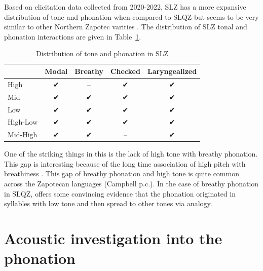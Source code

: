 \documentclass[12pt, letterpaper]{article}
\providecommand{\lsptoprule}{\midrule\toprule}
\providecommand{\lspbottomrule}{\bottomrule\midrule}
\begin{document}
Based on elicitation data collected from 2020-2022, SLZ has a more expansive distribution of tone and phonation when compared to SLQZ but seems to be very similar to other Northern Zapotec varities \citep[e.g.,][]{avelinobecerraTopicsYalalagZapotec2004}. The distribution of SLZ tonal and phonation interactions are given in Table~\ref{tab:ToneVoiceQuality}. 
\begin{table}[!h]
	\caption{Distribution of tone and phonation in SLZ}
	\label{tab:ToneVoiceQuality}
	\centering

	\begin{tabular}{lcccc}
	\lsptoprule
		& \textbf{Modal} & \textbf{Breathy} & \textbf{Checked} & \textbf{Laryngealized} \\
	\hline
	High	& ✔ & -- & ✔ & ✔ \\
	Mid	& ✔ & ✔ & ✔ & ✔\\
	Low	& ✔	& ✔ & ✔ & ✔\\
	High-Low	& ✔	& ✔ & ✔ & ✔\\
	Mid-High	& ✔	& ✔ & -- & ✔ \\
	\lspbottomrule
	\end{tabular}
\end{table}

One of the striking things in this is the lack of high tone with breathy phonation. This gap is interesting because of the long time association of high pitch with breathiness \citep[a good overview–of this association and other phoantion types–is found in][]{eslingVoiceQualityLaryngeal2019}. This gap of breathy phonation and high tone is quite common across the Zapotecan languages (Campbell p.c.). In the case of breathy phonation in SLQZ, \citet{uchiharaToneRegistrogenesisQuiavini2016} offers some convincing evidence that the phonation originated in syllables with low tone and then spread to other tones via analogy. 

\section{Acoustic investigation into the phonation} \label{sec:Acoustics}
\end{document}
